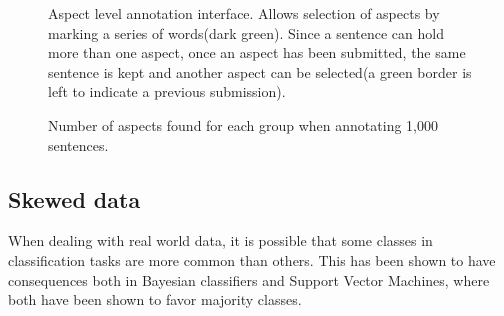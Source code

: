 \documentclass[a4paper,11pt]{kth-mag}
\begin{document}
\begin{figure}[h]
  \centering
  \caption{Aspect level annotation interface. Allows selection of aspects by marking a series of words(dark green). Since a sentence can hold more than one aspect, once an aspect has been submitted, the same sentence is kept and another aspect can be selected(a green border is left to indicate a previous submission).}
  \label{fig:annotate_aspect}
\end{figure}

\begin{figure}[t]
  \centering
  \caption{Number of aspects found for each group when annotating 1,000 sentences.}
  \label{fig:cat_count}
\end{figure}

\subsection{Skewed data}
\label{sec:data_skew}
When dealing with real world data, it is possible that some classes in classification tasks are more
common than others. This has been shown to have consequences both in Bayesian classifiers\cite{rennie2003bias}
and Support Vector Machines\cite{svm_bias}, where both have been shown to favor majority
classes.
\end{document}
